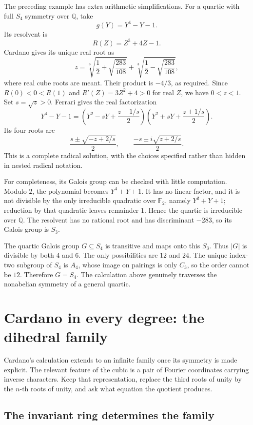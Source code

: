 \documentclass[11pt]{article}
\theoremstyle{remark}
\newcommand{\Q}{\mathbb Q}
\begin{document}
The preceding example has extra arithmetic simplifications. For a quartic with full \(S_4\) symmetry over \(\Q\), take
\[
g(Y)=Y^4-Y-1.
\]
Its resolvent is
\[
R(Z)=Z^3+4Z-1.
\]
Cardano gives its unique real root as
\begin{equation}
z=\sqrt[3]{\frac12+\sqrt{\frac{283}{108}}}
 +\sqrt[3]{\frac12-\sqrt{\frac{283}{108}}},
\label{eq:s4-example}
\end{equation}
where real cube roots are meant. Their product is \(-4/3\), as required. Since \(R(0)<0<R(1)\) and \(R'(Z)=3Z^2+4>0\) for real \(Z\), we have \(0<z<1\). Set \(s=\sqrt z>0\). Ferrari gives the real factorization
\[
Y^4-Y-1=
\left(Y^2-sY+\frac{z-1/s}{2}\right)
\left(Y^2+sY+\frac{z+1/s}{2}\right).
\]
Its four roots are
\[
\frac{s\pm\sqrt{-z+2/s}}{2},\qquad
\frac{-s\pm i\sqrt{z+2/s}}{2}.
\]
This is a complete radical solution, with the choices specified rather than hidden in nested radical notation.

For completeness, its Galois group can be checked with little computation. Modulo \(2\), the polynomial becomes \(Y^4+Y+1\). It has no linear factor, and it is not divisible by the only irreducible quadratic over \(\mathbb F_2\), namely \(Y^2+Y+1\); reduction by that quadratic leaves remainder \(1\). Hence the quartic is irreducible over \(\Q\). The resolvent has no rational root and has discriminant \(-283\), so its Galois group is \(S_3\).

The quartic Galois group \(G\subseteq S_4\) is transitive and maps onto this \(S_3\). Thus \(|G|\) is divisible by both \(4\) and \(6\). The only possibilities are \(12\) and \(24\). The unique index-two subgroup of \(S_4\) is \(A_4\), whose image on pairings is only \(C_3\), so the order cannot be \(12\). Therefore \(G=S_4\). The calculation above genuinely traverses the nonabelian symmetry of a general quartic.

\section{Cardano in every degree: the dihedral family}
\label{dihedral:section}

Cardano's calculation extends to an infinite family once its symmetry is made explicit. The relevant feature of the cubic is a pair of Fourier coordinates carrying inverse characters. Keep that representation, replace the third roots of unity by the \(n\)-th roots of unity, and ask what equation the quotient produces.

\subsection{The invariant ring determines the family}
\end{document}
